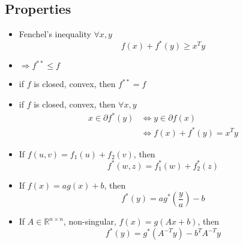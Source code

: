 \documentclass[10pt]{article}
\newcommand{\R}{\mathbb{R}}
\begin{document}
\subsection*{Properties}
\begin{itemize}
\item Fenchel's inequality $\forall x, y$
\begin{equation}
f(x) + f^*(y) \ge x^T y
\end{equation}
\item $ \Longrightarrow f^{**} \le f$
\item if $f$ is closed, convex, then $f^{**} = f$
\item if $f$ is closed, convex, then $\forall x, y$
\begin{align}
x \in \partial f^*(y) & \Longleftrightarrow y \in \partial f(x)\\
	& \Longleftrightarrow f(x) + f^*(y) = x^T y
\end{align}
\item If $f(u,v) = f_1(u) + f_2(v)$, then
\begin{equation}
f^*(w,z) = f^*_1(w) + f^*_2(z)
\end{equation}

\item If $f(x) = a g(x) + b$, then
\begin{equation}
 f^*(y) = a g^*(\frac{y}{a}) - b
\end{equation}
\item If $A\in \R^{n\times n}$, non-singular, $f(x) = g(Ax+b)$, then
\begin{equation}
f^*(y) = g^*(A^{-T} y) - b^T A^{-T} y
\end{equation}
\end{itemize}
\end{document}
